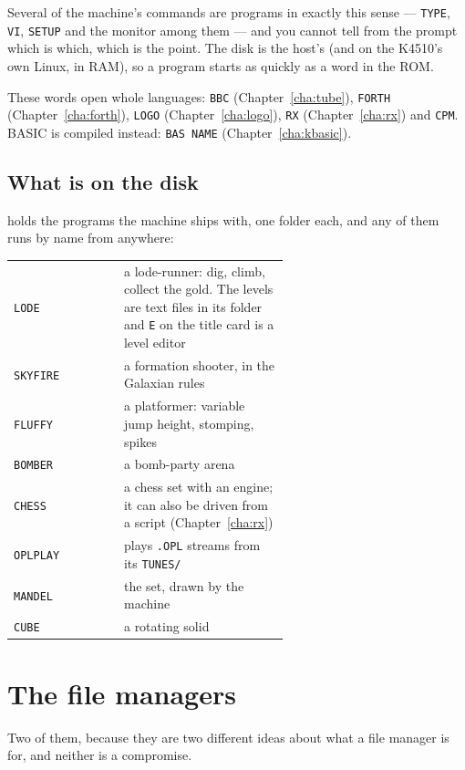 Several of the machine's commands are programs in exactly this sense ---
\verb|TYPE|, \verb|VI|, \verb|SETUP| and the monitor among them --- and
you cannot tell from the prompt which is which, which is the point. The
disk is the host's (and on the K4510's own Linux, in RAM), so a program
starts as quickly as a word in the ROM.

These words open whole languages: \verb|BBC|
(Chapter~\ref{cha:tube}), \verb|FORTH| (Chapter~\ref{cha:forth}),
\verb|LOGO| (Chapter~\ref{cha:logo}),
\verb|RX| (Chapter~\ref{cha:rx}) and
\verb|CPM|.
BASIC is compiled instead: \verb|BAS NAME| (Chapter~\ref{cha:kbasic}).

\subsection*{What is on the disk}
 holds the programs the machine ships with, one folder each,
and any of them runs by name from anywhere:

\begin{center}
\small
\begin{tabular}{@{}l >{\raggedright\arraybackslash}p{0.60\linewidth}@{}}
\toprule
\verb|LODE| & a lode-runner: dig, climb, collect the gold. The levels are text files in its folder and \texttt{E} on the title card is a level editor \\
\verb|SKYFIRE| & a formation shooter, in the Galaxian rules \\
\verb|FLUFFY| & a platformer: variable jump height, stomping, spikes \\
\verb|BOMBER| & a bomb-party arena \\
\verb|CHESS| & a chess set with an engine; it can also be driven from a script (Chapter~\ref{cha:rx}) \\
\verb|OPLPLAY| & plays \texttt{.OPL} streams from its \texttt{TUNES/} \\
\verb|MANDEL| & the set, drawn by the machine \\
\verb|CUBE| & a rotating solid \\
\bottomrule
\end{tabular}
\end{center}

\section{The file managers}
Two of them, because they are two different ideas about what a file
manager is for, and neither is a compromise.

